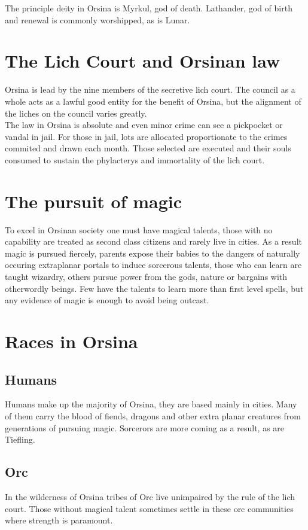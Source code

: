 \documentclass[10pt,twoside,twocolumn,openany,justified,bg=full,nomultitoc]{dndbook}
\begin{document}
The principle deity in Orsina is Myrkul, god of death. Lathander, god of birth and renewal is commonly worshipped, as is Lunar.

\section{The Lich Court and Orsinan law}
\label{sec-3-1}
Orsina is lead by the nine members of the secretive lich court. The council as a whole acts as a lawful good entity for the benefit of Orsina, but the alignment of the liches on the council varies greatly.\\

The law in Orsina is absolute and even minor crime can see a pickpocket or vandal in jail. For those in jail, lots are allocated proportionate to the crimes commited and drawn each month. Those selected are executed and their souls consumed to sustain the phylacterys and immortality of the lich court. 

\section{The pursuit of magic}
\label{sec-3-2}
To excel in Orsinan society one must have magical talents, those with no capability are treated as second class citizens and rarely live in cities. As a result magic is pursued fiercely, parents expose their babies to the dangers of naturally occuring extraplanar portals to induce sorcerous talents, those who can learn are taught wizardry, others pursue power from the gods, nature or bargains with otherwordly beings. Few have the talents to learn more than first level spells, but any evidence of magic is enough to avoid being outcast.

\section{Races in Orsina}
\label{sec-3-3}
\subsection{Humans}
\label{sec-3-3-1}
Humans make up the majority of Orsina, they are based mainly in cities. Many of them carry the blood of fiends, dragons and other extra planar creatures from generations of pursuing magic. Sorcerors are more coming as a result, as are Tiefling.

\subsection{Orc}
\label{sec-3-3-2}
In the wilderness of Orsina tribes of Orc live unimpaired by the rule of the lich court. Those without magical talent sometimes settle in these orc communities where strength is paramount.
\end{document}
